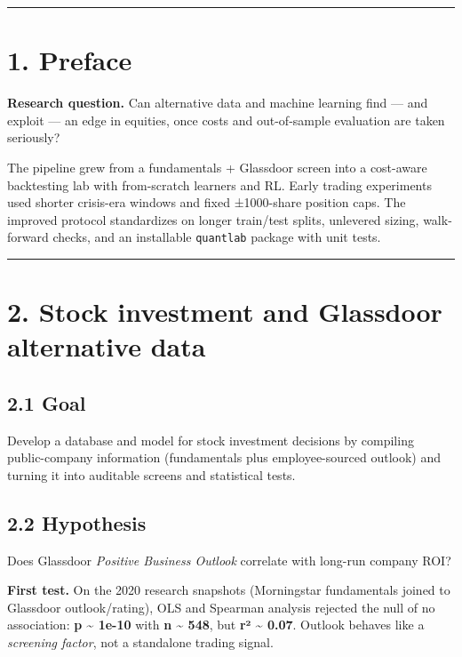 \documentclass[
  11pt,
]{article}
\begin{document}
\begin{center}\rule{0.5\linewidth}{0.5pt}\end{center}

\section{1. Preface}\label{preface}

\textbf{Research question.} Can alternative data and machine learning
find --- and exploit --- an edge in equities, once costs and
out-of-sample evaluation are taken seriously?

The pipeline grew from a fundamentals + Glassdoor screen into a
cost-aware backtesting lab with from-scratch learners and RL. Early
trading experiments used shorter crisis-era windows and fixed
±1000-share position caps. The improved protocol standardizes on longer
train/test splits, unlevered sizing, walk-forward checks, and an
installable \texttt{quantlab} package with unit tests.

\begin{center}\rule{0.5\linewidth}{0.5pt}\end{center}

\section{2. Stock investment and Glassdoor alternative
data}\label{stock-investment-and-glassdoor-alternative-data}

\subsection{2.1 Goal}\label{goal}

Develop a database and model for stock investment decisions by compiling
public-company information (fundamentals plus employee-sourced outlook)
and turning it into auditable screens and statistical tests.

\subsection{2.2 Hypothesis}\label{hypothesis}

Does Glassdoor \emph{Positive Business Outlook} correlate with long-run
company ROI?

\textbf{First test.} On the 2020 research snapshots (Morningstar
fundamentals joined to Glassdoor outlook/rating), OLS and Spearman
analysis rejected the null of no association: \textbf{p
\textasciitilde{} 1e-10} with \textbf{n \textasciitilde{} 548}, but
\textbf{r² \textasciitilde{} 0.07}. Outlook behaves like a
\emph{screening factor}, not a standalone trading signal.
\end{document}
